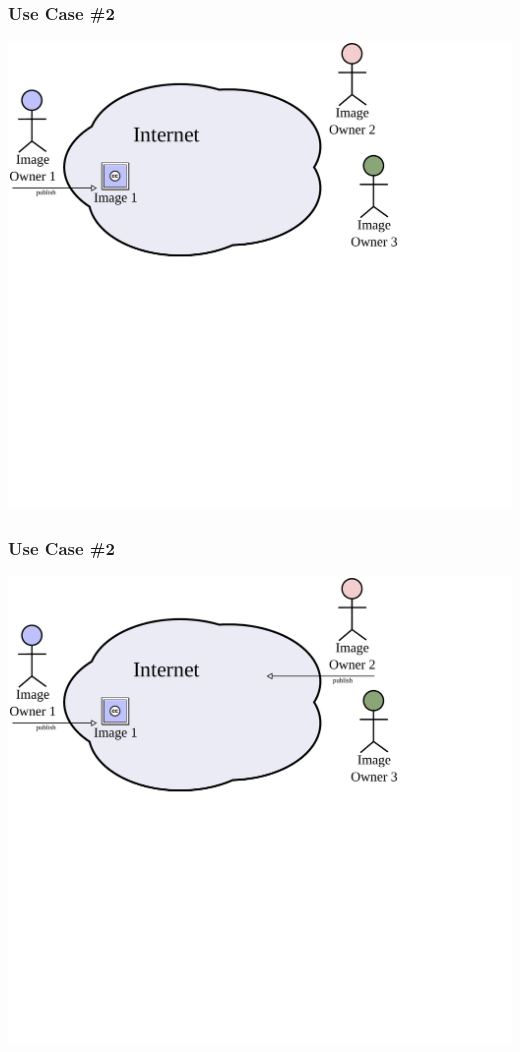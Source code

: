 \documentclass[mathserif,xcolor=dvipsnames,hyperref={bookmarks=true}]{beamer}
\begin{document}
    \begin{frame}[t]
        \frametitle{Use Case \#2}
        \begin{center}
            \includegraphics[width=0.9\textheight]{../resources/usecases/usecase2/usecase2-step06.pdf}
        \end{center}
    \end{frame}
    \begin{frame}[t]
        \frametitle{Use Case \#2}
        \begin{center}
            \includegraphics[width=0.9\textheight]{../resources/usecases/usecase2/usecase2-step07.pdf}
        \end{center}
    \end{frame}
\end{document}
